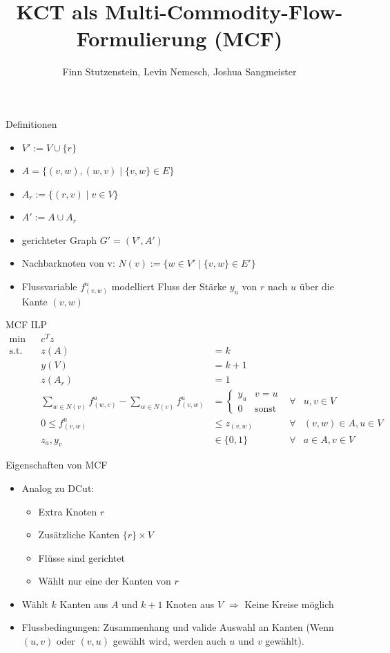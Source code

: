 \documentclass[ngerman,aspectratio=169,10pt]{beamer}
\title{KCT als Multi-Commodity-Flow-Formulierung (MCF)}
\author{Finn Stutzenstein, Levin Nemesch, Joshua Sangmeister}
\institute{Algorithm Engineering - Übung 4}
\begin{document}
	
\maketitle

\begin{frame}{Definitionen}
    \begin{itemize}
        \item $V' := V \cup \{r\}$
        \item $A = \{(v, w), (w, v) \mid \{v, w\} \in E\}$
        \item $A_r := \{(r, v) \mid v \in V\}$
        \item $A' := A \cup A_r$
        \item gerichteter Graph $G'=(V', A')$
        \item Nachbarknoten von v: $N(v) := \{w \in V'  \mid \{v, w\} \in E'\}$
        \item Flussvariable $f^u_{(v,w)}$ modelliert Fluss der Stärke $y_u$ von $r$ nach $u$ über die Kante $(v,w)$
    \end{itemize}
\end{frame}

\begin{frame}{MCF ILP}
	\begin{align*}
    	\min && c^Tz & &&\\
    	\text{s.t.} && z(A) &= k &&\\
    	&& y(V) &= k+1 &&\\
    	&& z(A_r) &= 1 &&\\
    	&& \sum_{w\in N(v)} f^u_{(w,v)} - \sum_{w\in N(v)} f^u_{(v,w)} &= \begin{cases}
    	        y_u & v=u\\
    	        0 & \text{sonst}
    	\end{cases} &\forall& u, v\in V\\
    	&& 0 \leq f^u_{(v,w)} &\leq z_{(v,w)} &\forall& (v, w) \in A, u \in V\\
    	&& z_a, y_v &\in \{0, 1\} &\forall& a \in A, v \in V
	\end{align*}
\end{frame}

\begin{frame}{Eigenschaften von MCF}
    \begin{itemize}
        \item Analog zu DCut:
        \begin{itemize}
            \item Extra Knoten $r$
            \item Zusätzliche Kanten $\{r\}\times V$
            \item Flüsse sind gerichtet
            \item Wählt nur eine der Kanten von $r$
        \end{itemize}
        \item Wählt $k$ Kanten aus $A$ und $k+1$ Knoten aus $V$ $\Rightarrow$ Keine Kreise möglich
        \item Flussbedingungen: Zusammenhang und valide Auswahl an Kanten (Wenn $(u, v)$ oder $(v, u)$ gewählt wird, werden auch $u$ und $v$ gewählt).
    \end{itemize}
\end{frame}
\end{document}
